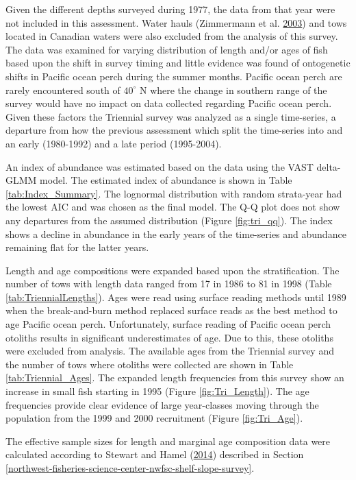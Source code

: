 \documentclass[12pt,]{article}
\begin{document}
Given the different depths surveyed during 1977, the data from that year
were not included in this assessment. Water hauls (Zimmermann et al.
\protect\hyperlink{ref-zimmermann_influence_2003}{2003}) and tows
located in Canadian waters were also excluded from the analysis of this
survey. The data was examined for varying distribution of length and/or
ages of fish based upon the shift in survey timing and little evidence
was found of ontogenetic shifts in Pacific ocean perch during the summer
months. Pacific ocean perch are rarely encountered south of \(40^\circ\)
N where the change in southern range of the survey would have no impact
on data collected regarding Pacific ocean perch. Given these factors the
Triennial survey was analyzed as a single time-series, a departure from
how the previous assessment which split the time-series into and an
early (1980-1992) and a late period (1995-2004).

An index of abundance was estimated based on the data using the VAST
delta-GLMM model. The estimated index of abundance is shown in Table
\ref{tab:Index_Summary}. The lognormal distribution with random
strata-year had the lowest AIC and was chosen as the final model. The
Q-Q plot does not show any departures from the assumed distribution
(Figure \ref{fig:tri_qq}). The index shows a decline in abundance in the
early years of the time-series and abundance remaining flat for the
latter years.

Length and age compositions were expanded based upon the stratification.
The number of tows with length data ranged from 17 in 1986 to 81 in 1998
(Table \ref{tab:TriennialLengths}). Ages were read using surface reading
methods until 1989 when the break-and-burn method replaced surface reads
as the best method to age Pacific ocean perch. Unfortunately, surface
reading of Pacific ocean perch otoliths results in significant
underestimates of age. Due to this, these otoliths were excluded from
analysis. The available ages from the Triennial survey and the number of
tows where otoliths were collected are shown in Table
\ref{tab:Triennial_Ages}. The expanded length frequencies from this
survey show an increase in small fish starting in 1995 (Figure
\ref{fig:Tri_Length}). The age frequencies provide clear evidence of
large year-classes moving through the population from the 1999 and 2000
recruitment (Figure \ref{fig:Tri_Age}).

The effective sample sizes for length and marginal age composition data
were calculated according to Stewart and Hamel
(\protect\hyperlink{ref-stewart_bootstrapping_2014}{2014}) described in
Section
\ref{northwest-fisheries-science-center-nwfsc-shelf-slope-survey}.
\end{document}
